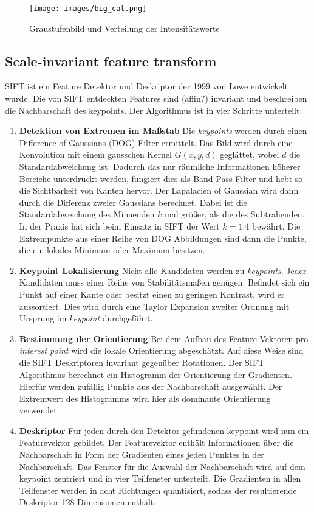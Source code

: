 \begin{figure}
	\centering
	\texttt{[image: images/big\_cat.png]}
	\caption{Graustufenbild und Verteilung der Intensitätswerte}
	\label{img:hist}
\end{figure}

\subsection{Scale-invariant feature transform}

SIFT ist ein Feature Detektor und Deskriptor der 1999 von Lowe entwickelt wurde. Die von SIFT entdeckten Features sind (affin?) invariant und beschreiben die Nachbarschaft des keypoints. Der Algorithmus ist in vier Schritte unterteilt:

\begin{enumerate}
	\item \textbf{Detektion von Extremen im Maßstab} Die \textit{keypoints} werden durch einen Difference of Gaussians (DOG) Filter ermittelt. Das Bild wird durch eine Konvolution mit einem gausschen Kernel $G(x, y, d)$ geglättet, wobei $d$ die Standardabweichung ist. Dadurch das nur räumliche Informationen höherer Bereiche unterdrückt werden, fungiert dies als Band Pass Filter und hebt so die Sichtbarkeit von Kanten hervor. Der Lapalacien of Gaussian wird dann durch die Differenz zweier Gaussians berechnet. Dabei ist die Standardabweichung des Minuenden $k$ mal größer, als die des Subtrahenden. In der Praxis hat sich beim Einsatz in SIFT der Wert $k = 1.4$ bewährt. Die Extrempunkte aus einer Reihe von DOG Abbildungen sind dann die Punkte, die ein lokales Minimum oder Maximum besitzen.
	\item \textbf{Keypoint Lokalisierung} Nicht alle Kandidaten werden zu \textit{keypoints}. Jeder Kandidaten muss einer Reihe von Stabilitätsmaßen genügen. Befindet sich ein Punkt auf einer Kante oder besitzt einen zu geringen Kontrast, wird er aussortiert. Dies wird durch eine Taylor Expansion zweiter Ordnung mit Ursprung im \textit{keypoint} durchgeführt.
	\item \textbf{Bestimmung der Orientierung} Bei dem Aufbau des Feature Vektoren pro \textit{interest point} wird die lokale Orientierung abgeschätzt. Auf diese Weise sind die SIFT Deskriptoren invariant gegenüber Rotationen. Der SIFT Algorithmus berechnet ein Histogramm der Orientierung der Gradienten. Hierfür werden zufällig Punkte aus der Nachbarschaft ausgewählt. Der Extremwert des Histogramms wird hier als dominante Orientierung verwendet.
	\item \textbf{Deskriptor} Für jeden durch den Detektor gefundenen keypoint wird nun ein Featurevektor gebildet. Der Featurevektor enthält Informationen über die Nachbarschaft in Form der Gradienten eines jeden Punktes in der Nachbarschaft. Das Fenster für die Auswahl der Nachbarschaft wird auf dem keypoint zentriert und in vier Teilfenster unterteilt. Die Gradienten in allen Teilfenster werden in acht Richtungen quantisiert, sodass der resultierende Deskriptor 128 Dimensionen enthält.
\end{enumerate}

